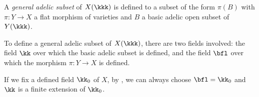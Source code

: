 

    \begin{definition}\label{def:general_adelic_subset}
        A \emph{general adelic subset} of \(X(\kkk)\) is defined to a subset of the form \(\pi(B)\) with \(\pi: Y \to X\) a flat morphism of varieties and \(B\) a basic adelic open subset of \(Y(\kkk)\).
    \end{definition}

    \begin{remark}\label{rmk:general_adelic_subset_and_define_field}
        To define a general adelic subset of \(X(\kkk)\), there are two fields involved: the field \(\kk\) over which the basic adelic subset is defined,
        and the field \(\bfl\) over which the morphism \(\pi:Y \to X\) is defined.

        If we fix a defined field \(\kk_0\) of \(X\), by \cite[Proposition 3.15 (ii) and (v)]{Xie25ZDOsurfaces}, we can always choose \(\bfl = \kk_0\) and \(\kk\) is a finite extension of \(\kk_0\).
    \end{remark}


